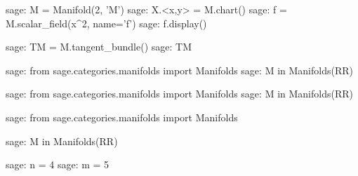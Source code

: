\documentclass[12pt]{article}
\begin{document}
\lipsum[2-3]
\begin{sagenotebook}
sage: M = Manifold(2, 'M')
sage: X.<x,y> = M.chart()
sage: f = M.scalar_field(x^2, name='f')
sage: f.display()
\end{sagenotebook}
\begin{sagenotebook}
sage: TM = M.tangent_bundle()
sage: TM
\end{sagenotebook}
\begin{sagenotebook}
sage: from sage.categories.manifolds import Manifolds
sage: M in Manifolds(RR)
\end{sagenotebook}
\begin{sagenotebook}
	sage: from sage.categories.manifolds import Manifolds
	sage: M in Manifolds(RR)
\end{sagenotebook}
\lipsum[1]
\begin{sagenotebook}
	sage: from sage.categories.manifolds import Manifolds

	sage: M in Manifolds(RR)
\end{sagenotebook}
\lipsum[7]
\begin{sagenotebook}
sage: n = 4
sage: m = 5
\end{sagenotebook}
\lipsum
\end{document}

